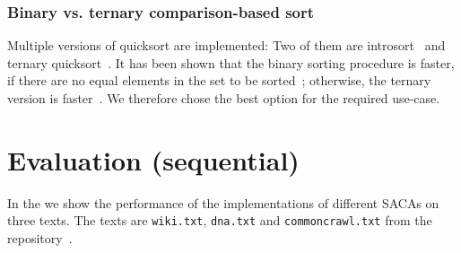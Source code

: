 \subsubsection{Binary vs. ternary comparison-based sort}

Multiple versions of quicksort are implemented:
Two of them are introsort~\cite{Musser97} and ternary quicksort~\cite{ternary_quicksort}.
It has been shown that the binary sorting procedure is faster,
if there are no equal elements in the set to be sorted~\cite{saca:4,ternary_quicksort};
otherwise, the ternary version is faster~\cite{ternary_quicksort}.
We therefore chose the best option for the required use-case.

\section{Evaluation (sequential)}

In the  we show the performance of the implementations of different SACAs on three texts.
The texts are \texttt{wiki.txt}, \texttt{dna.txt} and \texttt{commoncrawl.txt} from the  repository~\cite{xxx}.

